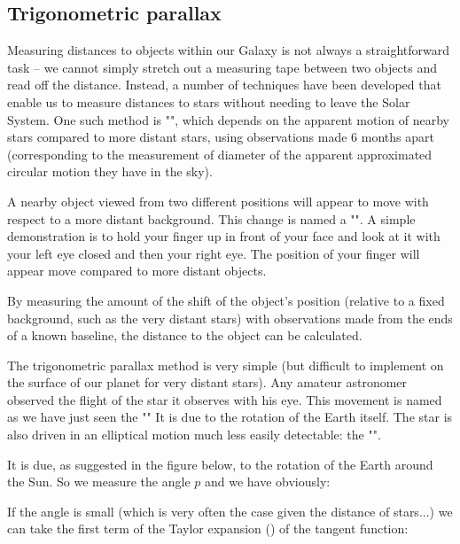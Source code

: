 	\subsection{Trigonometric parallax}
	Measuring distances to objects within our Galaxy is not always a straightforward task – we cannot simply stretch out a measuring tape between two objects and read off the distance. Instead, a number of techniques have been developed that enable us to measure distances to stars without needing to leave the Solar System. One such method is "", which depends on the apparent motion of nearby stars compared to more distant stars, using observations made $6$ months apart (corresponding to the measurement of diameter of the apparent approximated circular motion they have in the sky).

	A nearby object viewed from two different positions will appear to move with respect to a more distant background. This change is named a "". A simple demonstration is to hold your finger up in front of your face and look at it with your left eye closed and then your right eye. The position of your finger will appear move compared to more distant objects.

	By measuring the amount of the shift of the object's position (relative to a fixed background, such as the very distant stars) with observations made from the ends of a known baseline, the distance to the object can be calculated.
	
	The trigonometric parallax method is very simple (but difficult to implement on the surface of our planet for very distant stars). Any amateur astronomer observed the flight of the star it observes with his eye. This movement is named as we have just seen the "" It is due to the rotation of the Earth itself. The star is also driven in an elliptical motion much less easily detectable: the "".

	It is due, as suggested in the figure below, to the rotation of the Earth around the Sun. So we measure the angle $p$ and we have obviously:
	
	If the angle is small (which is very often the case given the distance of stars...) we can take the first term of the Taylor expansion () of the tangent function:
	
